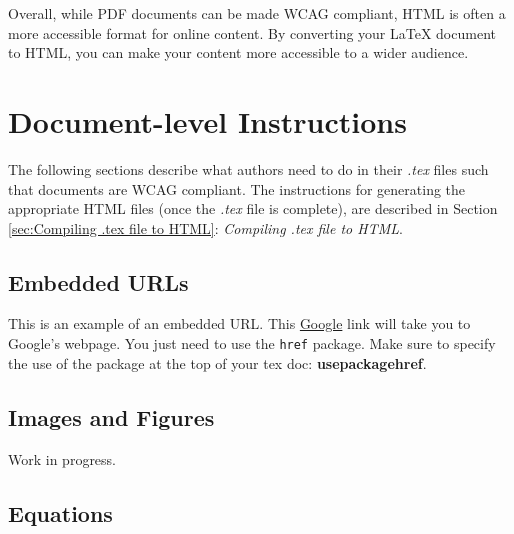 \documentclass[lang=en]{article}
\newcommand{\code}[1]{\colorbox{light-gray}{\texttt{#1}}}
\begin{document}
Overall, while PDF documents can be made WCAG compliant, HTML is often a more
accessible format for online content. By converting your LaTeX document to
HTML, you can make your content more accessible to a wider audience.


\section{Document-level Instructions}

The following sections describe what authors need to do in their \textit{.tex}
files such that documents are WCAG compliant. The instructions for generating
the appropriate HTML files (once the \textit{.tex} file is complete), are
described in Section \ref{sec:Compiling .tex file to HTML}: \textit{Compiling
  .tex file to HTML}.

\subsection{Embedded URLs}

This is an example of an embedded URL. This
\href{https://www.google.com/}{Google} link will take you to Google's
webpage. You just need to use the \code{href} package. Make sure to specify the
use of the package at the top of your tex doc: \textbf{usepackage{href}}.


\subsection{Images and Figures}

Work in progress.





\subsection{Equations}
\end{document}
